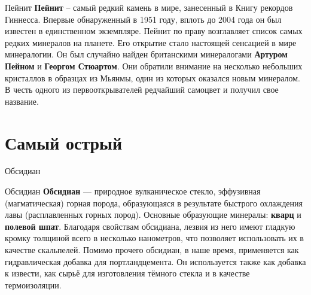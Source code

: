 \documentclass{beamer}
\begin{document}
	\begin{frame}[t]{Пейнит}
		\text{\qquad}
			\textbf{Пейнит} – самый редкий камень в мире, занесенный в Книгу рекордов Гиннесса. Впервые обнаруженный в 1951 году, вплоть до 2004 года он был известен в единственном экземпляре.
		\newline
		\text{\qquad}
			Пейнит по праву возглавляет список самых редких минералов на планете. Его открытие стало настоящей сенсацией в мире минералогии. Он был случайно найден британскими минералогами \textbf{Артуром Пейном} и \textbf{Георгом Стюартом}. Они обратили внимание на несколько небольших кристаллов в образцах из Мьянмы, один из которых оказался новым минералом. В честь одного из первооткрывателей редчайший самоцвет и получил свое название.
	\end{frame}

\section{Самый острый}
	\begin{frame}[c]{Обсидиан}
	\end{frame}

	\begin{frame}[t]{Обсидиан}
		\text{\qquad}
			\textbf{Обсидиан} — природное вулканическое стекло, эффузивная (магматическая) горная порода, образующаяся в результате быстрого охлаждения лавы (расплавленных горных пород). Основные образующие минералы: \textbf{кварц} и \textbf{полевой шпат}.
		\newline
		\text{\qquad}
			Благодаря свойствам обсидиана, лезвия из него имеют гладкую кромку толщиной всего в несколько нанометров, что позволяет использовать их в качестве скальпелей.
		\newline
		\text{\qquad}
			Помимо прочего обсидиан, в наше время, применяется как гидравлическая добавка для портландцемента. Он используется также как добавка к извести, как сырьё для изготовления тёмного стекла и в качестве термоизоляции.
	\end{frame}
\end{document}
